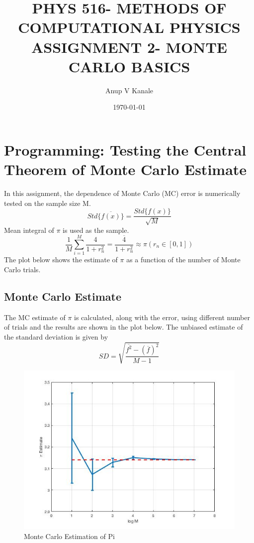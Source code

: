 \documentclass[12pt, oneside]{article}   	%
\title{\vspace{-6ex} \large PHYS 516- METHODS OF COMPUTATIONAL PHYSICS \\
        \normalsize ASSIGNMENT 2- MONTE CARLO BASICS }
\author{\vspace{-3ex}Anup V Kanale}
\date{\vspace{-2ex} \today}
\begin{document}
\maketitle
\section{Programming: Testing the Central Theorem of Monte Carlo Estimate}
In this assignment, the dependence of Monte Carlo (MC) error is numerically tested on the sample size M.
	\begin{equation}
	Std\{\overline{f(x)}\} = \frac{Std\{f(x)\}}{\sqrt{M}}
	\end{equation}
Mean integral of $\pi$ is used as the sample.
	\begin{equation}
	\frac{1}{M} \sum\limits_{i=1}^{M} \frac{4}{1+r_n^2} = \overline{\frac{4}{1+r_n^2}} \approx \pi (r_n \in \left[0,1 \right]) 
	\end{equation}
The plot below shows the estimate of $\pi$ as a function of the number of Monte Carlo trials.
 \subsection{Monte Carlo Estimate}
 The MC estimate of $\pi$ is calculated, along with the error, using different number of trials and the results are shown in the plot below. The unbiased estimate of the standard deviation is given by
	\begin{equation}
	SD = \sqrt{\frac{\overline{f^2} - (\overline{f})^2}{M-1}}
	\end{equation}
 	\begin{figure} [!htbp]
	\centering
	 \includegraphics[scale=0.35]{MC_piEstimate.jpg}
	\caption{Monte Carlo Estimation of Pi}
	\end{figure}
	
\end{document}
